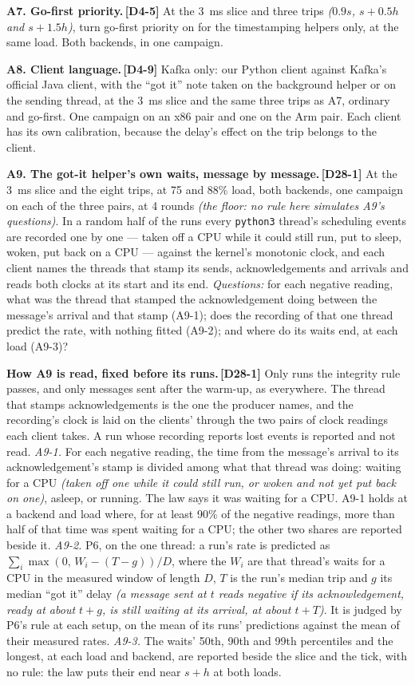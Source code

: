 \documentclass[11pt]{article}
\newcommand{\gl}[1]{{\color{soft}\itshape\small (#1)}}
\newcommand{\chgold}[1]{\,{\color{oldcol}\bfseries\footnotesize[#1]}}
\begin{document}
\textbf{A7. Go-first priority.}\chgold{D4-5} At the 3~ms slice and three trips \gl{$0.9s$, $s + 0.5h$ and $s + 1.5h$}, turn go-first priority on for the timestamping helpers only, at the same load. Both backends, in one campaign.

\textbf{A8. Client language.}\chgold{D4-9} Kafka only: our Python client against Kafka's official Java client, with the ``got it'' note taken on the background helper or on the sending thread, at the 3~ms slice and the same three trips as A7, ordinary and go-first. One campaign on an x86 pair and one on the Arm pair. Each client has its own calibration, because the delay's effect on the trip belongs to the client.

\textbf{A9. The got-it helper's own waits, message by message.}\chgold{D28-1} At the 3~ms slice and the eight trips, at 75 and 88\% load, both backends, one campaign on each of the three pairs, at 4 rounds \gl{the floor: no rule here simulates A9's questions}. In a random half of the runs every \texttt{python3} thread's scheduling events are recorded one by one --- taken off a CPU while it could still run, put to sleep, woken, put back on a CPU --- against the kernel's monotonic clock, and each client names the threads that stamp its sends, acknowledgements and arrivals and reads both clocks at its start and its end. \emph{Questions:} for each negative reading, what was the thread that stamped the acknowledgement doing between the message's arrival and that stamp (A9-1); does the recording of that one thread predict the rate, with nothing fitted (A9-2); and where do its waits end, at each load (A9-3)?

\textbf{How A9 is read, fixed before its runs.}\chgold{D28-1} Only runs the integrity rule passes, and only messages sent after the warm-up, as everywhere. The thread that stamps acknowledgements is the one the producer names, and the recording's clock is laid on the clients' through the two pairs of clock readings each client takes. A run whose recording reports lost events is reported and not read. \emph{A9-1.} For each negative reading, the time from the message's arrival to its acknowledgement's stamp is divided among what that thread was doing: waiting for a CPU \gl{taken off one while it could still run, or woken and not yet put back on one}, asleep, or running. The law says it was waiting for a CPU. A9-1 holds at a backend and load where, for at least 90\% of the negative readings, more than half of that time was spent waiting for a CPU; the other two shares are reported beside it. \emph{A9-2.} P6, on the one thread: a run's rate is predicted as $\sum_i \max(0,\, W_i - (T - g))/D$, where the $W_i$ are that thread's waits for a CPU in the measured window of length $D$, $T$ is the run's median trip and $g$ its median ``got it'' delay \gl{a message sent at $t$ reads negative if its acknowledgement, ready at about $t + g$, is still waiting at its arrival, at about $t + T$}. It is judged by P6's rule at each setup, on the mean of its runs' predictions against the mean of their measured rates. \emph{A9-3.} The waits' 50th, 90th and 99th percentiles and the longest, at each load and backend, are reported beside the slice and the tick, with no rule: the law puts their end near $s + h$ at both loads.
\end{document}
